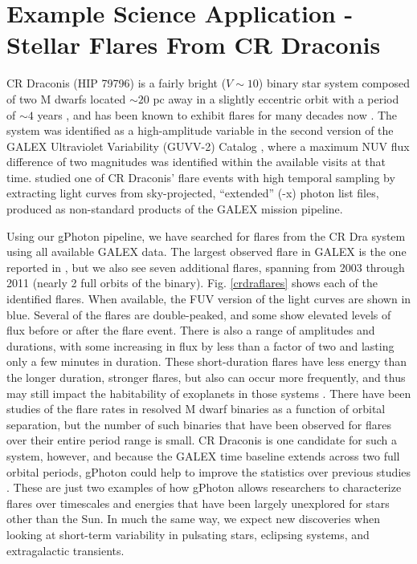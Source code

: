 \documentclass[preprint]{aastex}
\begin{document}
\section{Example Science Application - Stellar Flares From CR Draconis}
\label{scienceexamples}
CR Draconis (HIP 79796) is a fairly bright ($V \sim 10$) binary star system composed of two M dwarfs located $\sim 20$ pc away in a slightly eccentric orbit with a period of $\sim 4$ years \citep{tam2008}, and has been known to exhibit flares for many decades now \citep{cri1970}. The system was identified as a high-amplitude variable in the second version of the GALEX Ultraviolet Variability (GUVV-2) Catalog \citep{whe2008}, where a maximum NUV flux difference of two magnitudes was identified within the available visits at that time. \citet{wel2006} studied one of CR Draconis' flare events with high temporal sampling by extracting light curves from sky-projected, ``extended'' (-x) photon list files, produced as non-standard products of the GALEX mission pipeline.

Using our gPhoton pipeline, we have searched for flares from the CR Dra system using all available GALEX data. The largest observed flare in GALEX is the one reported in \citet{wel2006}, but we also see seven additional flares, spanning from 2003 through 2011 (nearly 2 full orbits of the binary). Fig. \ref{crdraflares} shows each of the identified flares. When available, the FUV version of the light curves are shown in blue.  Several of the flares are double-peaked, and some show elevated levels of flux before or after the flare event.  There is also a range of amplitudes and durations, with some increasing in flux by less than a factor of two and lasting only a few minutes in duration. These short-duration flares have less energy than the longer duration, stronger flares, but also can occur more frequently, and thus may still impact the habitability of exoplanets in those systems \citep[e.g.,][]{ram2013}. There have been studies of the flare rates in resolved M dwarf binaries as a function of orbital separation, but the number of such binaries that have been observed for flares over their entire period range is small. CR Draconis is one candidate for such a system, however, and because the GALEX time baseline extends across two full orbital periods, gPhoton could help to improve the statistics over previous studies \citep{tam2008}. These are just two examples of how gPhoton allows researchers to characterize flares over timescales and energies that have been largely unexplored for stars other than the Sun.  In much the same way, we expect new discoveries when looking at short-term variability in pulsating stars, eclipsing systems, and extragalactic transients.
\end{document}
